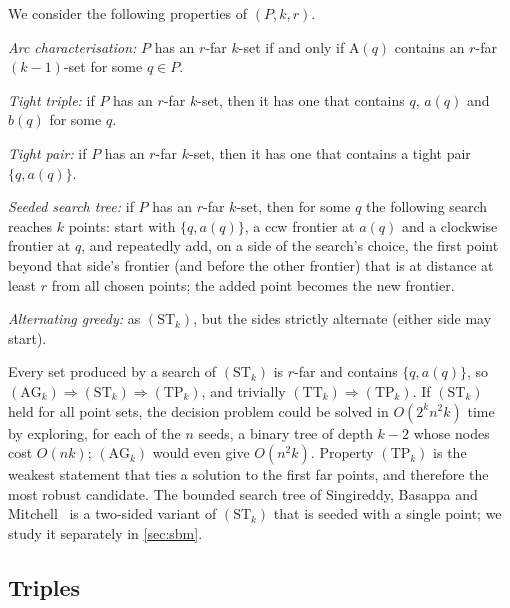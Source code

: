 \documentclass[11pt,a4paper]{article}
\theoremstyle{definition}
\theoremstyle{remark}
\newcommand{\Arc}{\mathrm{A}}
\begin{document}
We consider the following properties of $(P,k,r)$.
\begin{description}[leftmargin=3.2em,labelwidth=2.6em,itemsep=2pt]
\item[$(\mathrm{G}_k)$] \emph{Arc characterisation:} $P$ has an $r$-far $k$-set
if and only if $\Arc(q)$ contains an $r$-far $(k-1)$-set for some $q\in P$.
\item[$(\mathrm{TT}_k)$] \emph{Tight triple:} if $P$ has an $r$-far $k$-set,
then it has one that contains $q$, $a(q)$ and $b(q)$ for some $q$.
\item[$(\mathrm{TP}_k)$] \emph{Tight pair:} if $P$ has an $r$-far $k$-set, then
it has one that contains a tight pair $\{q,a(q)\}$.
\item[$(\mathrm{ST}_k)$] \emph{Seeded search tree:} if $P$ has an $r$-far $k$-set, then
for some $q$ the following search reaches $k$ points: start with
$\{q,a(q)\}$, a ccw frontier at $a(q)$ and a clockwise frontier at $q$, and
repeatedly add, on a side of the search's choice, the first point beyond that
side's frontier (and before the other frontier) that is at distance at least
$r$ from all chosen points; the added point becomes the new frontier.
\item[$(\mathrm{AG}_k)$] \emph{Alternating greedy:} as $(\mathrm{ST}_k)$, but
the sides strictly alternate (either side may start).
\end{description}
Every set produced by a search of $(\mathrm{ST}_k)$ is $r$-far and contains
$\{q,a(q)\}$, so
$(\mathrm{AG}_k)\Rightarrow(\mathrm{ST}_k)\Rightarrow(\mathrm{TP}_k)$, and
trivially $(\mathrm{TT}_k)\Rightarrow(\mathrm{TP}_k)$. If $(\mathrm{ST}_k)$ held
for all point sets, the decision problem could be solved in $O(2^kn^2k)$ time
by exploring, for each of the $n$ seeds, a binary tree of depth $k-2$ whose
nodes cost $O(nk)$; $(\mathrm{AG}_k)$ would even give $O(n^2k)$. Property
$(\mathrm{TP}_k)$ is the weakest statement that ties a solution to the first
far points, and therefore the most robust candidate. The bounded search tree
of Singireddy, Basappa and Mitchell~\cite{sbm} is a two-sided variant of
$(\mathrm{ST}_k)$ that is seeded with a single point; we study it separately
in \cref{sec:sbm}.

\subsection{Triples}\label{sec:k3}
\end{document}
